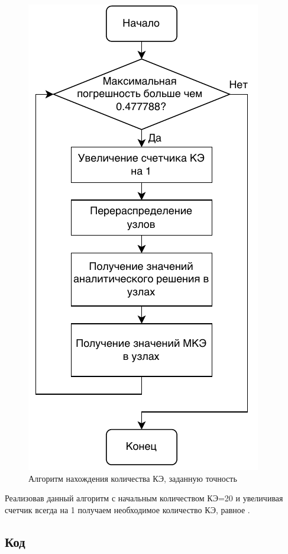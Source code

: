 \begin{figure}[H]
\centerline{\includegraphics[scale = 0.65]{labs/img/img2.pdf}}
\caption{Алгоритм нахождения количества КЭ, заданную точность}
\label{alg}
\end{figure}

Реализовав данный алгоритм с начальным количеством КЭ=20 и увеличивая счетчик всегда на 1 получаем необходимое количество КЭ, равное .

\subsection{Код}

